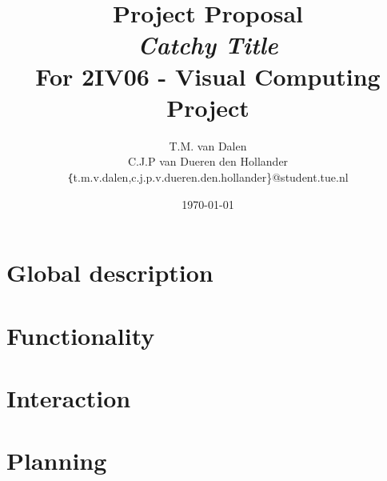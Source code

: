 \documentclass[11pt,a4paper,twocolumn]{article}
\title{
	{\huge Project Proposal\\ \emph{Catchy Title}}\\
	{\large For 2IV06 - Visual Computing Project}
}
\author{
	T.M. van Dalen \\
	C.J.P van Dueren den Hollander\\
	{\texttt\{t.m.v.dalen,c.j.p.v.dueren.den.hollander\}}@student.tue.nl
}
\date{\today}
\begin{document}
	\maketitle
	
	
	
	\section{Global description}
	\label{sec:desc}
	

	\section{Functionality}
	\label{sec:func}
	

	\section{Interaction}
	\label{sec:interaction}
	

	\section{Planning}
	\label{sec:planning}
	

	
	
\end{document}

